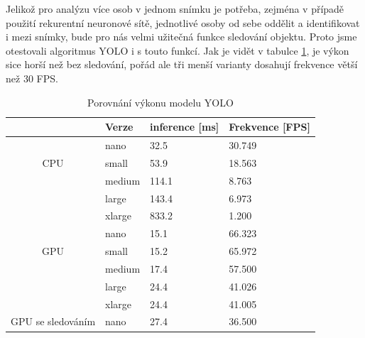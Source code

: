Jelikož pro analýzu více osob v jednom snímku je potřeba, zejména v případě
použití rekurentní neuronové sítě, jednotlivé osoby od sebe oddělit a
identifikovat i mezi snímky, bude pro nás velmi užitečná funkce sledování
objektu. Proto jsme otestovali algoritmus YOLO i s touto funkcí. Jak je vidět v
tabulce \ref{tab:yolo_performance}, je výkon sice horší než bez sledování,
pořád ale tři menší varianty dosahují frekvence větší než $30$ FPS.

\begin{table}[htbp]
    \centering
    \caption{Porovnání výkonu modelu YOLO}
    \label{tab:yolo_performance}
    \begin{tabular}{|c|l|l|l|}
        \hline
                                           & \textbf{Verze} & \textbf{inference [ms]} & \textbf{Frekvence [FPS]} \\
        \hline\hline
        \multirow{3}{*}{CPU}               & nano           & 32.5                    & 30.749                   \\ \cline{2-4}
                                           & small          & 53.9                    & 18.563                   \\ \cline{2-4}
                                           & medium         & 114.1                   & 8.763                    \\ \cline{2-4}
                                           & large          & 143.4                   & 6.973                    \\ \cline{2-4}
                                           & xlarge         & 833.2                   & 1.200                    \\ \hline\hline
        \multirow{3}{*}{GPU}               & nano           & 15.1                    & 66.323                   \\ \cline{2-4}
                                           & small          & 15.2                    & 65.972                   \\ \cline{2-4}
                                           & medium         & 17.4                    & 57.500                   \\ \cline{2-4}
                                           & large          & 24.4                    & 41.026                   \\ \cline{2-4}
                                           & xlarge         & 24.4                    & 41.005                   \\ \hline\hline
        \multirow{3}{*}{GPU se sledováním} & nano           & 27.4                    & 36.500                   \\ \cline{2-4}

\end{tabular}
\end{table}
